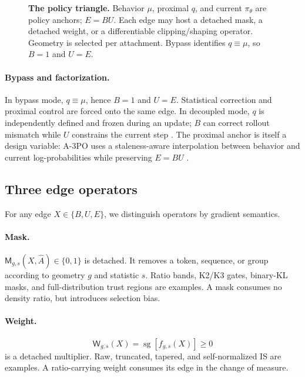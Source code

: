 \documentclass[10pt,twocolumn]{article}
\newcommand{\beh}{\mu}
\newcommand{\prox}{q}
\newcommand{\cur}{\pi_\theta}
\newcommand{\B}{B}
\newcommand{\U}{U}
\newcommand{\E}{E}
\newcommand{\sg}{\operatorname{sg}}
\newcommand{\Mask}{\mathsf{M}}
\newcommand{\Weight}{\mathsf{W}}
\begin{document}
\begin{figure}[t]
    \centering
    \resizebox{0.96\textwidth}{!}{}
    \caption{\textbf{The policy triangle.}  Behavior \(\beh\), proximal \(\prox\), and current \(\cur\) are policy anchors; \(\E=\B\U\).  Each edge may host a detached mask, a detached weight, or a differentiable clipping/shaping operator.  Geometry is selected per attachment.  Bypass identifies \(\prox\equiv\beh\), so \(\B=1\) and \(\U=\E\).}
    \label{fig:triangle}
\end{figure}

\paragraph{Bypass and factorization.}
In bypass mode, \(\prox\equiv\beh\), hence \(\B=1\) and \(\U=\E\).  Statistical correction and proximal control are forced onto the same edge.  In decoupled mode, \(\prox\) is independently defined and frozen during an update; \(\B\) can correct rollout mismatch while \(\U\) constrains the current step \citep{hilton2022batch,fu2025areal}.  The proximal anchor is itself a design variable: A-3PO uses a staleness-aware interpolation between behavior and current log-probabilities while preserving \(\E=\B\U\) \citep{li2025a3po}.

\subsection{Three edge operators}

For any edge \(X\in\{\B,\U,\E\}\), we distinguish operators by gradient semantics.

\paragraph{Mask.}
\(\Mask_{g,s}(X,\hat A)\in\{0,1\}\) is detached.  It removes a token, sequence, or group according to geometry \(g\) and statistic \(s\).  Ratio bands, K2/K3 gates, binary-KL masks, and full-distribution trust regions are examples.  A mask consumes no density ratio, but introduces selection bias.

\paragraph{Weight.}
\begin{equation}
    \Weight_{g,s}(X)=\sg[f_{g,s}(X)]\ge0
    \label{eq:weight}
\end{equation}
is a detached multiplier.  Raw, truncated, tapered, and self-normalized IS are examples.  A ratio-carrying weight consumes its edge in the change of measure.
\end{document}
